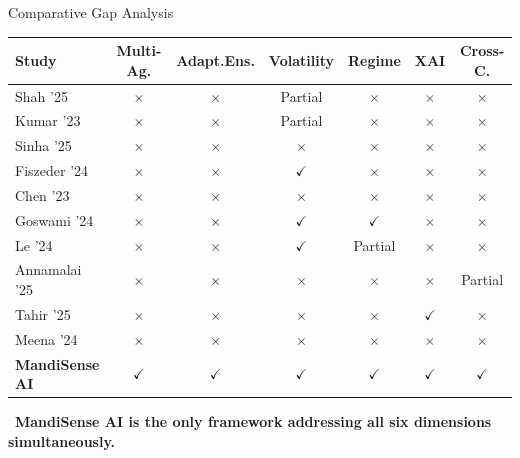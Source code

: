 \documentclass{beamer}
\begin{document}
\begin{frame}[label=gap_analysis]{Comparative Gap Analysis}

\footnotesize
\renewcommand{\arraystretch}{1.2}
\setlength{\tabcolsep}{4pt}

\begin{tcolorbox}[enhanced, colback=white, colframe=primaryblue!40, arc=4pt, boxrule=0.3pt,
  left=2pt, right=2pt, top=2pt, bottom=2pt, shadow={1pt}{-1pt}{0pt}{black!10}]
\begin{tabular}{lcccccc}
\toprule
\textbf{Study} & \textbf{Multi-Ag.} & \textbf{Adapt.Ens.} & \textbf{Volatility} & \textbf{Regime} & \textbf{XAI} & \textbf{Cross-C.} \\
\midrule
Shah '25 & $\times$ & $\times$ & Partial & $\times$ & $\times$ & $\times$ \\
Kumar '23 & $\times$ & $\times$ & Partial & $\times$ & $\times$ & $\times$ \\
Sinha '25 & $\times$ & $\times$ & $\times$ & $\times$ & $\times$ & $\times$ \\
Fiszeder '24 & $\times$ & $\times$ & $\checkmark$ & $\times$ & $\times$ & $\times$ \\
Chen '23 & $\times$ & $\times$ & $\times$ & $\times$ & $\times$ & $\times$ \\
Goswami '24 & $\times$ & $\times$ & $\checkmark$ & $\checkmark$ & $\times$ & $\times$ \\
Le '24 & $\times$ & $\times$ & $\checkmark$ & Partial & $\times$ & $\times$ \\
Annamalai '25 & $\times$ & $\times$ & $\times$ & $\times$ & $\times$ & Partial \\
Tahir '25 & $\times$ & $\times$ & $\times$ & $\times$ & $\checkmark$ & $\times$ \\
Meena '24 & $\times$ & $\times$ & $\times$ & $\times$ & $\times$ & $\times$ \\
\midrule
\rowcolor{accentgreen!12}
\textbf{MandiSense AI} & $\checkmark$ & $\checkmark$ & $\checkmark$ & $\checkmark$ & $\checkmark$ & $\checkmark$ \\
\bottomrule
\end{tabular}
\end{tcolorbox}

\vspace{0.1cm}

\begin{tcolorbox}[enhanced, colback=accentgreen!5, colframe=accentgreen!50, arc=5pt,
  boxrule=0.3pt, left=6pt, right=6pt, top=3pt, bottom=3pt,
  shadow={1pt}{-1pt}{0pt}{black!10}]
\centering\footnotesize
{}~\textbf{MandiSense AI is the only framework addressing all six dimensions simultaneously.}
\end{tcolorbox}

\end{frame}
\end{document}
